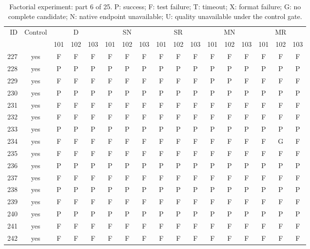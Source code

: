 \begin{table}[p]\centering\footnotesize
\setlength{\tabcolsep}{3pt}
\caption{Factorial experiment: part 6 of 25. P: success; F: test failure; T: timeout; X: format failure; G: no complete candidate; N: native endpoint unavailable; U: quality unavailable under the control gate.}
\begin{tabular*}{\textwidth}{@{\extracolsep{\fill}}rcccccccccccccccc}\toprule
ID & Control & \multicolumn{3}{c}{D} & \multicolumn{3}{c}{SN} & \multicolumn{3}{c}{SR} & \multicolumn{3}{c}{MN} & \multicolumn{3}{c}{MR}\\
\cmidrule(lr){3-5}\cmidrule(lr){6-8}\cmidrule(lr){9-11}\cmidrule(lr){12-14}\cmidrule(lr){15-17}
 & & 101 & 102 & 103 & 101 & 102 & 103 & 101 & 102 & 103 & 101 & 102 & 103 & 101 & 102 & 103\\\midrule
227 & yes & F & F & F & F & F & F & F & F & F & F & F & F & F & F & F\\
228 & yes & P & P & P & P & P & P & P & P & P & P & P & P & P & P & P\\
229 & yes & F & F & F & F & F & F & F & F & F & P & P & F & F & F & F\\
230 & yes & P & P & P & P & P & P & P & P & P & P & P & P & P & P & P\\
231 & yes & F & F & F & F & F & F & F & F & F & F & F & F & F & F & F\\
232 & yes & F & F & F & F & F & F & F & F & F & F & F & F & F & F & F\\
233 & yes & P & P & P & P & P & P & P & P & P & P & P & P & P & P & P\\
234 & yes & F & F & F & F & F & F & F & F & F & F & F & F & F & G & F\\
235 & yes & F & F & F & F & F & F & F & F & F & F & F & F & F & F & F\\
236 & yes & P & P & P & P & P & P & P & P & P & P & P & P & P & P & P\\
237 & yes & F & F & F & F & F & F & F & F & F & F & F & F & F & F & F\\
238 & yes & P & P & P & P & P & P & P & P & P & P & P & P & P & P & P\\
239 & yes & F & F & F & F & F & F & F & F & F & F & F & F & F & F & F\\
240 & yes & P & P & P & P & P & P & P & P & P & P & P & P & P & P & P\\
241 & yes & F & F & F & F & F & F & F & F & F & F & F & F & F & F & F\\
242 & yes & F & F & F & F & F & F & F & F & F & F & F & F & F & F & F\\

\end{tabular*}
\end{table}
